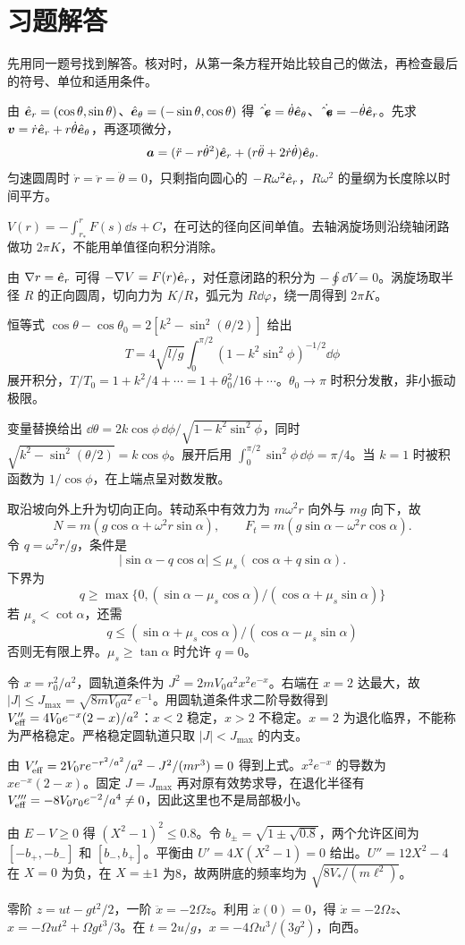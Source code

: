 \section*{习题解答}
先用同一题号找到解答。核对时，从第一条方程开始比较自己的做法，再检查最后的符号、单位和适用条件。
\begin{bookexercises}
\item 由 $\hat{\boldsymbol{e}}_r=(\cos\theta,\sin\theta)$、$\hat{\boldsymbol{e}}_\theta=(-\sin\theta,\cos\theta)$ 得 $\dot{\hat{\boldsymbol{e}}_r}=\dot\theta\hat{\boldsymbol{e}}_\theta$、$\dot{\hat{\boldsymbol{e}}_\theta}=-\dot\theta\hat{\boldsymbol{e}}_r$。先求 $\boldsymbol{v}=\dot r\hat{\boldsymbol{e}}_r+r\dot\theta\hat{\boldsymbol{e}}_\theta$，再逐项微分，
\[
\boldsymbol{a}=(\ddot r-r\dot\theta^2)\hat{\boldsymbol{e}}_r+(r\ddot\theta+2\dot r\dot\theta)\hat{\boldsymbol{e}}_\theta.
\]
匀速圆周时 $\dot r=\ddot r=\ddot\theta=0$，只剩指向圆心的 $-R\omega^2\hat{\boldsymbol{e}}_r$，$R\omega^2$ 的量纲为长度除以时间平方。
\item $V(r)=-\int_{r_*}^{r}F(s)\dd s+C$，在可达的径向区间单值。去轴涡旋场则沿绕轴闭路做功 $2\pi K$，不能用单值径向积分消除。

由 $\nabla r=\hat{\boldsymbol{e}}_r$ 可得 $-\nabla V=F(r)\hat{\boldsymbol{e}}_r$，对任意闭路的积分为 $-\oint\dd V=0$。涡旋场取半径 $R$ 的正向圆周，切向力为 $K/R$，弧元为 $R\dd\varphi$，绕一周得到 $2\pi K$。
\item 恒等式 $\cos\theta-\cos\theta_0=2[k^2-\sin^2(\theta/2)]$ 给出 
\[T=4\sqrt{l/g}\int_0^{\pi/2}(1-k^2\sin^2\phi)^{-1/2}\dd\phi\]
展开积分，$T/T_0=1+k^2/4+\cdots=1+\theta_0^2/16+\cdots$。$\theta_0\to\pi$ 时积分发散，非小振动极限。

变量替换给出 $\dd\theta=2k\cos\phi\,\dd\phi/\sqrt{1-k^2\sin^2\phi}$，同时 $\sqrt{k^2-\sin^2(\theta/2)}=k\cos\phi$。展开后用 $\int_0^{\pi/2}\sin^2\phi\,\dd\phi=\pi/4$。当 $k=1$ 时被积函数为 $1/\cos\phi$，在上端点呈对数发散。
\item 取沿坡向外上升为切向正向。转动系中有效力为 $m\omega^2r$ 向外与 $mg$ 向下，故 \[
N=m(g\cos\alpha+\omega^2r\sin\alpha),\qquad
F_t=m(g\sin\alpha-\omega^2r\cos\alpha).
\]令 $q=\omega^2r/g$，条件是
\[
|\sin\alpha-q\cos\alpha|\le\mu_s(\cos\alpha+q\sin\alpha).
\]
下界为 
\[q\ge\max\{0,(\sin\alpha-\mu_s\cos\alpha)/(\cos\alpha+\mu_s\sin\alpha)\}\]
若 $\mu_s<\cot\alpha$，还需 
\[q\le(\sin\alpha+\mu_s\cos\alpha)/(\cos\alpha-\mu_s\sin\alpha)\]
否则无有限上界。$\mu_s\ge\tan\alpha$ 时允许 $q=0$。
\item 令 $x=r_0^2/a^2$，圆轨道条件为 $J^2=2mV_0a^2x^2e^{-x}$。右端在 $x=2$ 达最大，故 $|J|\le J_{\max}=\sqrt{8mV_0a^2}\,e^{-1}$。用圆轨道条件求二阶导数得到 $V_{\rm eff}''=4V_0e^{-x}(2-x)/a^2$：$x<2$ 稳定，$x>2$ 不稳定。$x=2$ 为退化临界，不能称为严格稳定。严格稳定圆轨道只取 $|J|<J_{\max}$ 的内支。

由 $V_{\rm eff}'=2V_0re^{-r^2/a^2}/a^2-J^2/(mr^3)=0$ 得到上式。$x^2e^{-x}$ 的导数为 $xe^{-x}(2-x)$。固定 $J=J_{\max}$ 再对原有效势求导，在退化半径有 $V_{\rm eff}'''=-8V_0r_0e^{-2}/a^4\ne0$，因此这里也不是局部极小。
\item 由 $E-V\ge0$ 得 $(X^2-1)^2\le0.8$。令 $b_\pm=\sqrt{1\pm\sqrt{0.8}}$，两个允许区间为 $[-b_+,-b_-]$ 和 $[b_-,b_+]$。平衡由 $U'=4X(X^2-1)=0$ 给出。$U''=12X^2-4$ 在 $X=0$ 为负，在 $X=\pm1$ 为8，故两阱底的频率均为 $\sqrt{8V_*/(m\ell^2)}$。
\item 零阶 $z=ut-gt^2/2$，一阶 $\ddot x=-2\Omega\dot z$。利用 $\dot x(0)=0$，得 $\dot x=-2\Omega z$、$x=-\Omega ut^2+\Omega gt^3/3$。在 $t=2u/g$，$x=-4\Omega u^3/(3g^2)$，向西。


\end{bookexercises}
